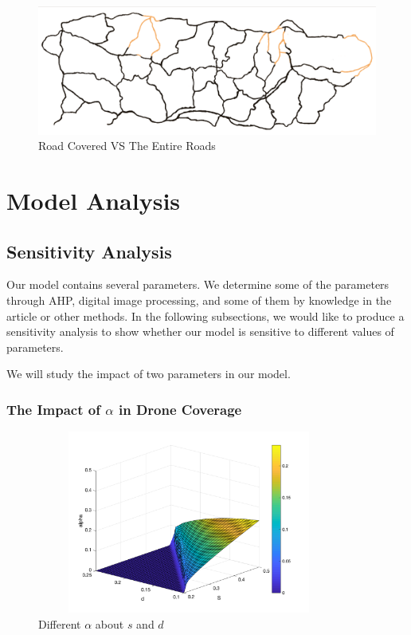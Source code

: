 \documentclass{mcmthesis}
\begin{document}
\begin{figure}[htbp]
    \centering
    \includegraphics[width=14cm]{figures/coverage.png}
    \caption{Road Covered VS The Entire Roads}
    \label{Fig:road}
\end{figure}


\section{Model Analysis}\label{Sec:mode}

\subsection{Sensitivity Analysis}

Our model contains several parameters. We determine some of the parameters through AHP, digital image processing, and some of them by knowledge in the article or other methods. In the following subsections, we would like to produce a sensitivity analysis to show whether our model is sensitive to different values of parameters.

We will study the impact of two parameters in our model.

\subsubsection{The Impact of $\alpha$ in Drone Coverage}
\begin{figure}[htbp]
    \centering
    \includegraphics[width=10cm,height=6cm]{figures/alpha.png}
    \caption{Different $\alpha$ about $s$ and $d$}
    \label{fig:alpha}
\end{figure}
\end{document}
